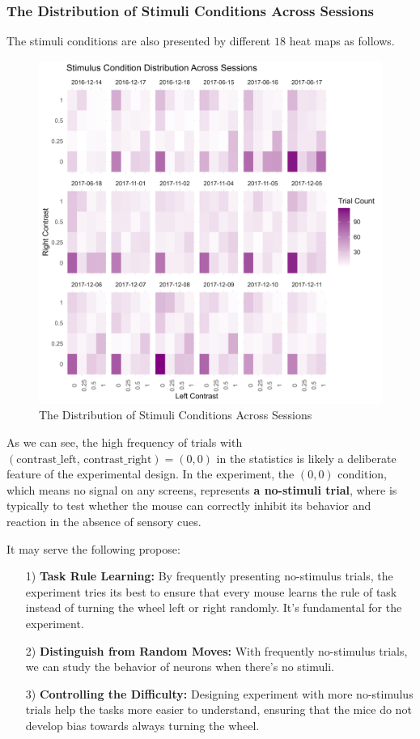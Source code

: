 \documentclass{article}
\begin{document}
	\subsubsection{The Distribution of Stimuli Conditions Across Sessions}
	\par The stimuli conditions are also presented by different $18$ heat maps as follows.
	\begin{figure}[htbp]
		\centering
		\includegraphics[scale = 0.7]{Pics/005}
		\caption{The Distribution of Stimuli Conditions Across Sessions}
		\label{fig:005}
	\end{figure}
	\par As we can see, the high frequency of trials with $(\mbox{contrast\_left, contrast\_right}) = (0,0)$ in the statistics is likely a deliberate feature of the experimental design. In the experiment, the $(0,0)$ condition, which means no signal on any screens, represents \textbf{a no-stimuli trial}, where is typically to test whether the mouse can correctly inhibit its behavior and reaction in the absence of sensory cues.
	\par It may serve the following propose:
	\begin{itemize}
		\item [1)] \textbf{Task Rule Learning:} By frequently presenting no-stimulus trials, the experiment tries its best to ensure that every mouse learns the rule of task instead of turning the wheel left or right randomly. It's fundamental for the experiment.
		\item [2)] \textbf{Distinguish from Random Moves:} With frequently no-stimulus trials, we can study the behavior of neurons when there's no stimuli.
		\item [3)] \textbf{Controlling the Difficulty:} Designing experiment with more no-stimulus trials help the tasks more easier to understand, ensuring that the mice do not develop bias towards always turning the wheel.
	\end{itemize}
	\clearpage
\end{document}
